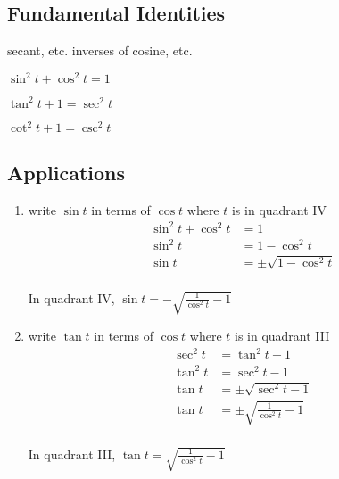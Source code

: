 \documentclass{exam}
\begin{document}
  \subsection{Fundamental Identities}
  \begin{itemize*}
    \item secant, etc. inverses of cosine, etc.
    \item $\sin^2 t + \cos^2 t = 1$
    \item $\tan^2 t + 1 = \sec^2 t$
    \item $\cot^2 t + 1 = \csc^2 t$
  \end{itemize*}

  \subsection{Applications}

  \begin{enumerate}
    \item write $\sin t$ in terms of $\cos t$ where $t$ is in quadrant IV
      \begin{align*}
        \sin^2 t + \cos^2 t & = 1 \\
        \sin^2 t            & = 1 - \cos^2 t \\
        \sin t              & = \pm \sqrt{ 1 - \cos^2 t } \\
      \end{align*}

      In quadrant IV, $\sin t = - \sqrt{ \frac{1}{\cos^2 t} - 1 }$ 

    \item write $\tan t$ in terms of $\cos t$ where $t$ is in quadrant III
      \begin{align*}
        \sec^2 t & = \tan^2 t + 1 \\
        \tan^2 t & = \sec^2 t - 1 \\
        \tan t   & = \pm \sqrt{ \sec^2 t - 1 } \\
        \tan t   & = \pm \sqrt{ \frac{1}{\cos^2 t} - 1 } \\
      \end{align*}

      In quadrant III, $\tan t = \sqrt{ \frac{1}{\cos^2 t} - 1 }$ 

  \end{enumerate}
\end{document}
